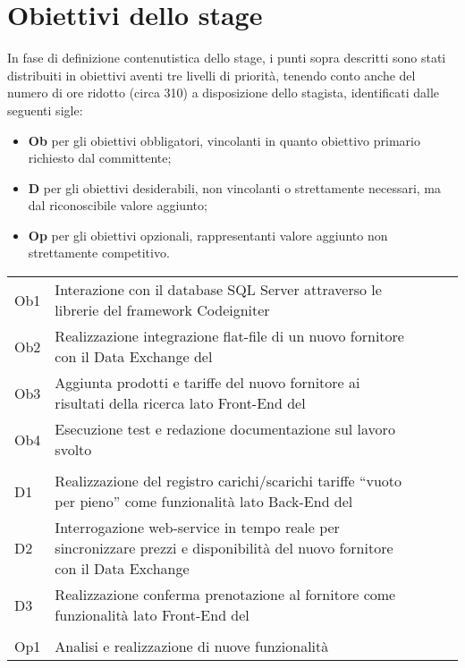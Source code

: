 \section{Obiettivi dello stage}
In fase di definizione contenutistica dello stage, i punti sopra descritti sono stati distribuiti in obiettivi aventi tre livelli di priorità, tenendo conto anche del numero di ore ridotto (circa 310) a disposizione dello stagista, identificati dalle seguenti sigle:
\begin{itemize}
	\item \textbf{Ob} per gli obiettivi obbligatori, vincolanti in quanto obiettivo primario richiesto dal committente;
	\item \textbf{D} per gli obiettivi desiderabili, non vincolanti o strettamente necessari, ma dal riconoscibile valore aggiunto;
	\item \textbf{Op} per gli obiettivi opzionali, rappresentanti valore aggiunto non strettamente competitivo.
\end{itemize}

\begin{longtable}{
		@{}
		>{\raggedright}p{.5cm}
		p{10.5cm}
		>{\raggedleft}p{0.2cm}@{}
		>{\raggedright}p{0.2cm}
		p{8.5cm}
		@{}} 
	\hline
	\multicolumn{2}{|c|}{\textbf{Obbligatori}}\\
	\hline
	Ob1 & Interazione con il database SQL Server attraverso le librerie del \gls{framework} Codeigniter\\
	\hline
	Ob2 & Realizzazione integrazione flat-file di un nuovo fornitore con il Data Exchange del \bookingEngine\\
	\hline
	Ob3 & Aggiunta prodotti e tariffe del nuovo fornitore ai risultati della ricerca lato Front-End del \bookingEngine\\
	\hline
	Ob4 & Esecuzione test e redazione documentazione sul lavoro svolto\\
	\hline
	\multicolumn{2}{|c|}{\textbf{Desiderabili}}\\
	\hline
	D1 & Realizzazione del registro carichi/scarichi tariffe “vuoto per pieno” come	funzionalità lato Back-End del \bookingEngine\\
	\hline
	D2 & Interrogazione web-service in tempo reale per sincronizzare prezzi e disponibilità del nuovo fornitore con il Data Exchange\\
	\hline
	D3 & Realizzazione conferma prenotazione al fornitore come funzionalità lato Front-End del \bookingEngine\\
	\hline
	\multicolumn{2}{|c|}{\textbf{Opzionali}}\\
	\hline
	Op1 & Analisi e realizzazione di nuove funzionalità\\
	\hline
\end{longtable}


